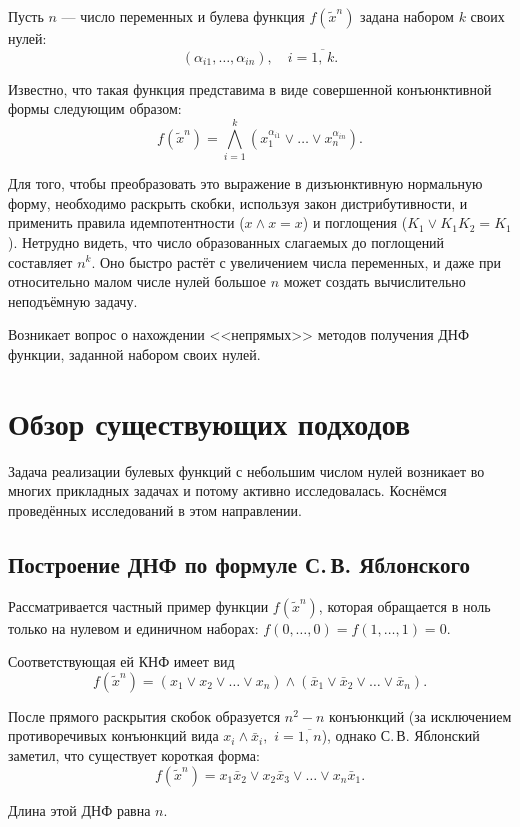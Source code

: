 \documentclass[12pt,a4paper,oneside,fleqn,leqno]{article}
\theoremstyle{definition}
\begin{document}
	Пусть $n$ --- число переменных и булева функция $f(\tilde x^n)$ задана набором $k$ своих нулей:
	$$
		(\alpha_{i1},\ldots,\alpha_{in}),\quad i=\overline{1,\,k}.
	$$\par
	Известно, что такая функция представима в виде совершенной конъюнктивной формы следующим образом:
	$$
		f(\tilde x^n) = \bigwedge_{i = 1}^k (x_1^{\alpha_{i1}} \vee \ldots \vee x_n^{\alpha_{in}}).
	$$\par
	Для того, чтобы преобразовать это выражение в дизъюнктивную нормальную форму, необходимо раскрыть скобки, используя закон дистрибутивности, и применить правила идемпотентности ($x\wedge x = x$) и поглощения ($K_1 \vee K_1K_2 = K_1$). %
Нетрудно видеть, что число образованных слагаемых до поглощений составляет $n^k.$ Оно быстро растёт с увеличением числа переменных, и даже при относительно малом числе нулей большое $n$ может создать вычислительно неподъёмную задачу.\par
	Возникает вопрос о нахождении <<непрямых>> методов получения ДНФ функции, заданной набором своих нулей.
	\section{Обзор существующих подходов}
		Задача реализации булевых функций с небольшим числом нулей возникает во многих прикладных задачах и потому активно исследовалась. Коснёмся проведённых исследований в этом направлении.
		\subsection{Построение ДНФ по формуле С.\,В. Яблонского}\label{jab}
			Рассматривается частный пример функции $f(\tilde x^n)$, которая обращается в ноль только на нулевом и единичном наборах: $f(0,\ldots,0) = f(1,\ldots,1) = 0.$\par
			Соответствующая ей КНФ имеет вид
			$$
				f(\tilde x^n) = (x_1 \vee x_2 \vee \ldots \vee x_n)\wedge(\bar{x}_1 \vee \bar{x}_2 \vee \ldots \vee \bar{x}_n).
			$$\par
			После прямого раскрытия скобок образуется $n^2 - n$ конъюнкций (за исключением противоречивых конъюнкций вида $x_i\wedge\bar{x}_i,\,\,i = \overline{1,\,n}$), однако С.\,В. Яблонский заметил, что существует короткая форма:
			$$
				f(\tilde x^n) = x_1\bar{x}_2 \vee x_2\bar{x}_3 \vee \ldots \vee x_n \bar{x}_1.
			$$\par
			Длина этой ДНФ равна $n.$
\end{document}
